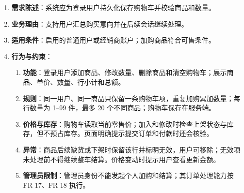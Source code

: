 \begin{enumerate}
\item {\bfseries 需求陈述}：系统应为登录用户持久化保存购物车并校验商品和数量。
\item {\bfseries 业务理由}：支持用户汇总购买意向并在后续会话继续处理。
\item {\bfseries 适用条件}：启用的普通用户或经销商账户；加购商品符合可售条件。
\item {\bfseries 行为与约束}：
\begin{enumerate}
\item {\bfseries 功能}：登录用户添加商品、修改数量、删除商品和清空购物车；展示商品、单价、数量、行小计和总额。
\item {\bfseries 规则}：同一用户、同一商品只保留一条购物车项，重复加购累加数量；每行数量为 1--99 件，最多 20 个不同商品；购物车保存在服务端。
\item {\bfseries 价格与库存}：购物车读取当前零售价；加入和修改时检查上架状态与库存，但不预占库存。页面明确提示提交订单和付款时还会核验。
\item {\bfseries 异常}：商品后续缺货或下架时保留该行并标明无效，用户可移除；无效项未处理前不得继续整车结算。价格变动时提示用户查看更新金额。
\item {\bfseries 管理员限制}：管理员身份不能发起个人加购和结算；其订单处理能力按 FR-17、FR-18 执行。
\end{enumerate}

\end{enumerate}


